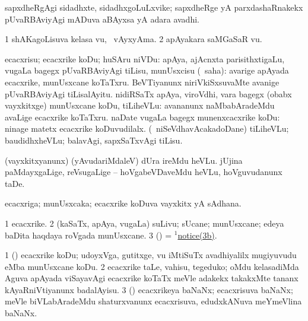 \bentry
{} 
\gl{\nA}
\expl{}
\bmng
sapxdheRgAgi sidadhxte, sidadhxgoLuLxvike; sapxdheRge yA parxdashaRnakekx pUvaRBAviyAgi mADuva aBAyxsa yA adara avadhi. 
\emng
\eentry

\bentry
{} 
\gl{\nA}
\expl{}
\bmng
\bnum
\num{1} shAKagoLisuva kelasa \mo vu, \udA\ vAyxyAma. 
\num{2} apAyakara saMGaSaR \mo vu. 
\enum
\emng
\eentry

\bentry
{} 
\gl{\sakirx}
\expl{}
\bmng
ecacxrisu; ecacxrike koDu; huSAru niVDu: 
\banum
{} apAya, ajAcnxta parisithxtigaLu, \mo vugaLa bagegx pUvaRBAviyAgi tiLisu, munUsxcisu (\akirx\ saha):  avarige apAyada ecacxrike, munUsxcane koTaTxru.  BeVTiyanunx niriVkiSxsuvaMte avanige pUvaRBAviyAgi tiLisalAyitu. 
 nidiRSaTx apAya, viroVdhi, \mo vara bagegx (obabx vayxkitxge) munUsxcane koDu, tiLiheVLu:  avananunx naMbabAradeMdu avaLige ecacxrike koTaTxru. 
 naDate \mo vugaLa bagegx munenxcacxrike koDu:  ninage matetx ecacxrike koDuvudilalx. 
 (\sA\ niSeVdhavAcakadoDane) tiLiheVLu; baudidhxheVLu; balavAgi, sapxSaTxvAgi tiLisu. 
\eanum
\emng

\noindent
\gl{\pagu}
\expl{}
\bmng
\bnum
{}  
\banum
{} (vayxkitxyanunx) (yAvudariMdaleV) dUra ireMdu heVLu. 
 jUjina paMdayxgaLige, reVsugaLige -- hoVgabeVDaveMdu heVLu, hoVguvudanunx taDe. 
\eanum
\numie
\enum
\emng
\eentry

\bentry 
{} 
\gl{\nA}
\expl{}
\bmng
ecacxriga; munUsxcaka; ecacxrike koDuva vayxkitx yA sAdhana. 
\emng
\eentry

\bentry
{} 
\gl{\nA}
\expl{}
\bmng
\bnum
\num{1} ecacxrike. 
\num{2} (kaSaTx, apAya, \mo vugaLa) suLivu; sUcane; munUsxcane;  edeya baDita haqdaya roVgada munUsxcane. 
\num{3} (\pArxparx) = \hyperref{kandict_n.pdf}{N}{notice(1)3b}{$^1$notice(3b)}. 
\enum
\emng

\noindent 
\gl{\pagu}
\expl{}
\bmng
\bnum
\num{1}  (\pArxparx) ecacxrike koDu; udoyxVga, gutitxge, \mo vu iMtiSuTx avadhiyalilx mugiyuvudu eMba munUsxcane koDu. 
\num{2}  ecacxrike taLe, vahisu, tegeduko; oMdu kelasadiMda Aguva apAyada viSayavAgi ecacxrike koTaTx meVle adakekx takakxMte tananx kAyaRniVtiyanunx badalAyisu. 
\num{3}  (\jiVvi) ecacxrikeya baNaNx; ecacxrisuva baNaNx; meVle biVLabAradeMdu shaturxvanunx ecacxrisuva, edudxkANuva meYmeVlina baNaNx. 
\enum
\emng
\eentry

